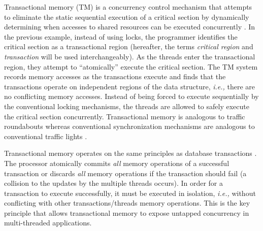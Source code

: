 \documentclass[11pt]{book}
\begin{document}
Transactional memory (TM) is a concurrency control mechanism that attempts to
eliminate the static sequential execution of a critical section by dynamically
determining when accesses to shared resources can be executed concurrently
\cite{sle_rajwar}.  In the previous example, instead of using locks, the
programmer identifies the critical section as a transactional region (hereafter,
the terms \emph{critical region} and \emph{transaction} will be used
interchangeably).  As the threads enter the transactional region, they attempt
to ``atomically'' execute the critical section.  The TM system records memory
accesses as the transactions execute and finds that the transactions operate on
independent regions of the data structure, \emph{i.e.,} there are no conflicting
memory accesses.  Instead of being forced to execute sequentially by the
conventional locking mechanisms, the threads are allowed to safely execute the
critical section concurrently.  Transactional memory is analogous to traffic
roundabouts whereas conventional synchronization mechanisms are analogous to
conventional traffic lights \cite{neuling_vid}.

Transactional memory operates on the same principles as database transactions
\cite{tm_2nd}.  The processor atomically commits \emph{all} memory operations of a
successful transaction or discards \emph{all} memory operations if the transaction should
fail (a collision to the updates by the multiple threads occurs).  In order for a
transaction to execute successfully, it must be executed in isolation, \emph{i.e.,}
without conflicting with other transactions/threads memory operations.  This is the key
principle that allows transactional memory to expose untapped concurrency in
multi-threaded applications.
\end{document}
